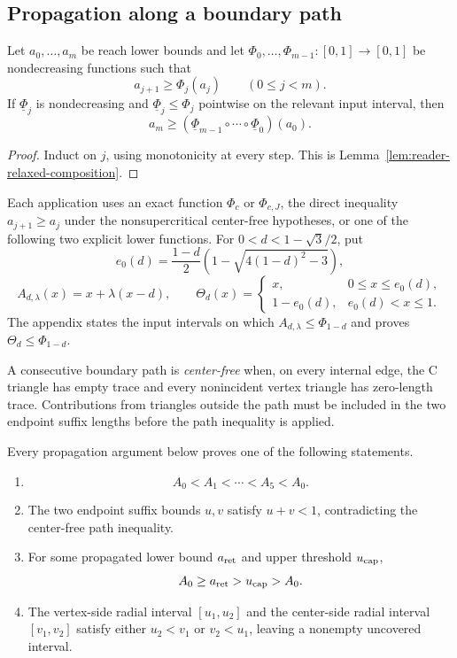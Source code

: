 \subsection{Propagation along a boundary path}

\begin{lemma}
\label{lem:body-monotone-propagation}
Let $a_0,\ldots,a_m$ be reach lower bounds and let
$\Phi_0,\ldots,\Phi_{m-1}:[0,1]\to[0,1]$ be nondecreasing functions such that
\[
 a_{j+1}\ge\Phi_j(a_j)\qquad(0\le j<m).
\]
If $\underline\Phi_j$ is nondecreasing and
$\underline\Phi_j\le\Phi_j$ pointwise on the relevant input interval, then
\[
 a_m\ge
 (\underline\Phi_{m-1}\circ\cdots\circ\underline\Phi_0)(a_0).
\]
\end{lemma}

\begin{proof}
Induct on $j$, using monotonicity at every step.  This is
Lemma~\ref{lem:reader-relaxed-composition}.
\end{proof}

Each application uses an exact function $\Phi_c$ or $\Phi_{c,J}$, the direct
inequality $a_{j+1}\ge a_j$ under the nonsupercritical center-free
hypotheses, or one of the following two explicit lower functions.  For
$0<d<1-\sqrt3/2$, put
\[
 e_0(d)=\frac{1-d}{2}
 \left(1-\sqrt{4(1-d)^2-3}\right),
\]
\[
 A_{d,\lambda}(x)=x+\lambda(x-d),
 \qquad
 \Theta_d(x)=
 \begin{cases}
 x,&0\le x\le e_0(d),\\
 1-e_0(d),&e_0(d)<x\le1.
 \end{cases}
\]
The appendix states the input intervals on which
$A_{d,\lambda}\le\Phi_{1-d}$ and proves
$\Theta_d\le\Phi_{1-d}$.

\begin{definition}
\label{def:body-center-free-path}
A consecutive boundary path is \emph{center-free} when, on every internal
edge, the C triangle has empty trace and every nonincident vertex
triangle has zero-length trace.  Contributions from triangles outside the
path must be included in the two endpoint suffix lengths before the path
inequality is applied.
\end{definition}

\begin{proposition}
\label{prop:body-strategy2-chain-principle}
Every propagation argument below proves one of the following statements.
\begin{enumerate}
\item
\[
 A_0<A_1<\cdots<A_5<A_0.
\]
\item The two endpoint suffix bounds $u,v$ satisfy $u+v<1$, contradicting the
center-free path inequality.
\item For some propagated lower bound $a_{\rm ret}$ and upper threshold
$u_{\rm cap}$,
\[
 A_0\ge a_{\rm ret}>u_{\rm cap}>A_0.
\]
\item The vertex-side radial interval $[u_1,u_2]$ and the center-side radial
interval $[v_1,v_2]$ satisfy either $u_2<v_1$ or $v_2<u_1$, leaving a
nonempty uncovered interval.
\end{enumerate}
\end{proposition}

